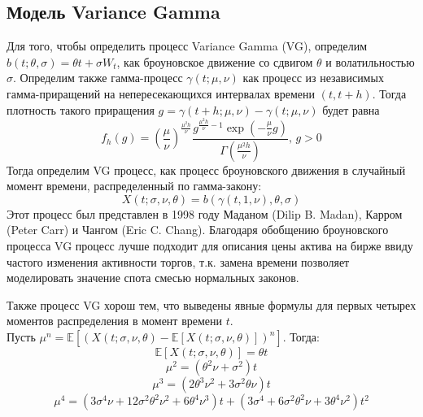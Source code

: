 \documentclass[oneside, final, 12pt]{article}
\begin{document}
\subsection{Модель Variance Gamma}
Для того, чтобы определить процесс Variance Gamma (VG), определим \( b(t; \theta, \sigma) = \theta t + \sigma W_t \), как броуновское движение со сдвигом $\theta$ и волатильностью $\sigma$. Определим также гамма-процесс $\gamma(t; \mu, \nu)$ как процесс из независимых гамма-приращений на непересекающихся интервалах времени $(t, t + h)$. Тогда плотность такого приращения $g = \gamma(t+h; \mu, \nu) - \gamma(t; \mu, \nu)$ будет равна \[ f_h(g) = \left(\frac{\mu}{\nu}\right)^{\frac{\mu^2h} {\nu} } \frac{g^{\frac{\mu^2h}{\nu} - 1} \exp{\left(-\frac{\mu}{\nu}g\right)}}{\Gamma\left( \frac{\mu^2h}{\nu} \right)}, \,g > 0 \] Тогда определим VG процесс, как процесс броуновского движения в случайный момент времени, распределенный по гамма-закону: \[ X(t; \sigma, \nu, \theta) = b(\gamma(t, 1, \nu), \theta, \sigma) \] Этот процесс был представлен в 1998 году Маданом (Dilip B. Madan), Карром (Peter Carr) и Чангом (Eric C. Chang). Благодаря обобщению броуновского процесса VG процесс лучше подходит для описания цены актива на бирже ввиду частого изменения активности торгов, т.к. замена времени позволяет моделировать значение спота смесью нормальных законов. \par
Также процесс VG хорош тем, что выведены\cite[стр. 85]{VG:paper} явные формулы для первых четырех моментов распределения в момент времени $t$. \\
Пусть \( \mu^n = \mathbb{E}\left[ (X(t; \sigma, \nu, \theta) - \mathbb{E}[X(t; \sigma, \nu, \theta)])^n \right] \). Тогда:
\[ \mathbb{E}[X(t; \sigma, \nu, \theta)] = \theta t \]
\[ \mu^2 = (\theta^2 \nu + \sigma^2)t \]
\[ \mu^3 = (2 \theta^3 \nu^2 + 3 \sigma^2 \theta \nu)t \]
\[ \mu^4 = (3 \sigma^4 \nu + 12 \sigma^2 \theta^2 \nu^2 + 6 \theta^4 \nu^3)t + 
(3 \sigma^4 + 6 \sigma^2 \theta^2 \nu + 3 \theta^4 \nu^2)t^2 \]

 
\newpage
\end{document}
